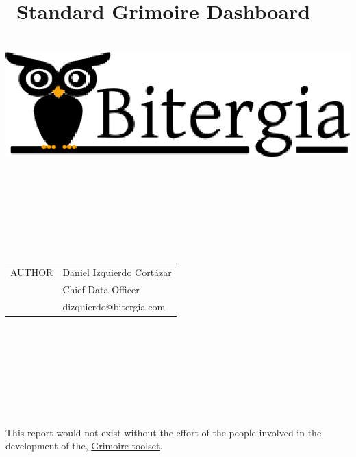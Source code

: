 \documentclass[a4wide,11pt]{report}
\begin{document}
\title{Standard Grimoire Dashboard
        ~~\\~~\\  \includegraphics[scale=.35]{logo.eps}       \\}

\maketitle


\newpage
~~\\~\\~\\~\\
\begin{tabular}{p{5cm}p{10cm}}
AUTHOR & Daniel Izquierdo Cort\'azar \\
       & Chief Data Officer  \\
       & dizquierdo@bitergia.com \\

\end{tabular}

~~\\~~\\

~~\\
~~\\

\begin{tabular}{p{5cm}p{10cm}}

\end{tabular}

~~\\
~~\\

This report would not exist without the effort of the people involved in the development of the, \href{http://metricsgrimoire.github.io}{Grimoire toolset}.

~~\\
~~\\
~~\\
~~\\
~~\\
~~\\
\end{document}
